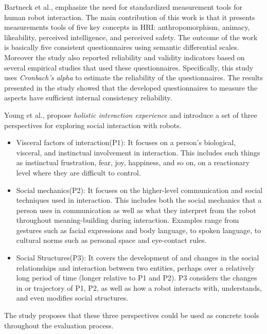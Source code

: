 {\begin{table}[H]
\begin{tabularx}{400pt}{c*3{X}}
  										\bottomrule
\end{tabularx}
\end{table}

	Bartneck et al.,\cite{bartneck2009measurement} emphasize the need for standardized measurement tools for human robot interaction. The main contribution of this work is that it presents measurements tools of five key concepts in HRI: anthropomorphism, animacy, likeability, perceived intelligence, and perceived safety. The outcome of the work is basically five consistent questionnaires using semantic differential scales. Moreover the study also reported reliability and validity indicators based on several empirical studies that used these questionnaires. Specifically, this study uses \emph{Cronbach's alpha} to estimate the reliability of the questionnaires. The results presented in the study showed that the developed questionnaires to measure the aspects have sufficient internal consistency reliability. 
	
	Young et al.,\cite{young2011evaluating} propose \emph{holistic interaction experience} and introduce a set of three perspectives for exploring social interaction with robots.
\begin{itemize}
\item Visceral factors of interaction(P1): It focuses on a person’s biological, visceral, and instinctual involvement in interaction. This includes such things as instinctual frustration, fear, joy, happiness, and so on, on a reactionary level where they are difficult to control.
\item Social mechanics(P2): It focuses on the higher-level communication and social techniques used in interaction. This includes both the social mechanics that a person uses in communication as well as what they interpret from the robot throughout meaning-building during interaction. Examples range from gestures such as facial expressions and body language, to spoken language, to cultural norms such as personal space and eye-contact rules.
\item Social Structures(P3): It covers the development of and changes in the social relationships and interaction between two entities, perhaps over a relatively long period of time (longer relative to P1 and P2). P3 considers the changes in or trajectory of P1, P2, as well as how a robot interacts with, understands, and even modifies social structures.
\end{itemize}
The study proposes that these three perspectives could be used as concrete tools throughout the evaluation process. 

}
